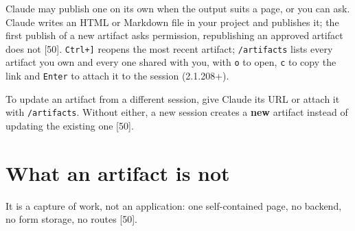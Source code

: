 \documentclass[11pt,a4paper,twoside,openany]{book}
\begin{document}
Claude may publish one on its own when the output suits a page, or you can ask. Claude writes an HTML or Markdown file in your project and publishes it; the first publish of a new artifact asks permission, republishing an approved artifact does not [50]. \texttt{Ctrl+]} reopens the most recent artifact; \texttt{/\allowbreak{}artifacts} lists every artifact you own and every one shared with you, with \texttt{o} to open, \texttt{c} to copy the link and \texttt{Enter} to attach it to the session (2.1.208+).


To update an artifact from a different session, give Claude its URL or attach it with \texttt{/\allowbreak{}artifacts}. Without either, a new session creates a \textbf{new} artifact instead of updating the existing one [50].


\FloatBarrier
\setcounter{section}{0}
\section{What an artifact is not}

It is a capture of work, not an application: one self-contained page, no backend, no form storage, no routes [50].
\end{document}
